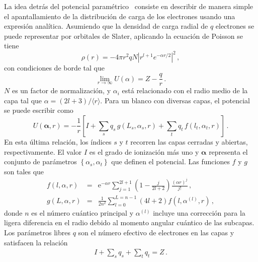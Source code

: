 La idea detrás del potencial paramétrico~\cite{Klapisch:77} consiste en
describir de manera simple el apantallamiento de la distribución de 
carga de los electrones usando una expresión analítica. Asumiendo que 
la densidad de carga radial de $q$ electrones se puede representar por 
orbitales de Slater, aplicando la ecuación de Poisson se tiene
\begin{equation}
\rho(r) = -4\pi r^2 qN\left|r^{l+1}e^{-\alpha r/2}\right|^2\,,
\end{equation} 
con condiciones de borde tal que
\begin{equation}
\lim_{r\rightarrow\infty} U(\alpha)=Z-\frac{q}{r}\,.
\end{equation} 
$N$ es un factor de normalización, y $\alpha_i$ está relacionado 
con el radio medio de la capa tal que $\alpha=(2l+3)/\langle r\rangle$. 
Para un blanco con diversas capas, el potencial se puede escribir como
\begin{equation}
U(\boldsymbol{\alpha},r)=-\frac{1}{r} \left[I+\sum_s q_s\, g(L_s,\alpha_s,r) 
+ \sum_t q_t\,f(l_t,\alpha_t,r)\right]\,.
\label{eq:potparam}
\end{equation}
En esta última relación, los índices $s$ y $t$ recorren las capas 
cerradas y abiertas, respectivamente. El valor $I$ es el grado de 
ionización más uno y $\boldsymbol{\alpha}$ representa el conjunto de 
parámetros $\left\{\alpha_s,\alpha_t\right\}$ que definen el potencial.
Las funciones $f$ y $g$ son tales que
\begin{eqnarray}
f(l,\alpha,r)&=&\mathrm{e}^{-\alpha r}\sum_{j=1}^{2l+1}
\left(1-\frac{j}{2l+2}\right)\frac{(\alpha r)^j}{j!}\,,\\
g(L,\alpha,r)&=&\frac{1}{2n^2}\sum_{l=0}^{L=n-1}
(4l+2)f\left(l,\alpha^{(l)},r\right)\,,
\end{eqnarray}
donde $n$ es el número cuántico principal y $\alpha^{(l)}$ incluye una
corrección para la ligera diferencia en el radio debido al momento 
angular cuántico de las subcapas. Los parámetros libres $q$ son el 
número efectivo de electrones en las capas y satisfacen la relación 
\begin{eqnarray}
I+\sum_s q_s+\sum_t q_t=Z\,.
\end{eqnarray}

